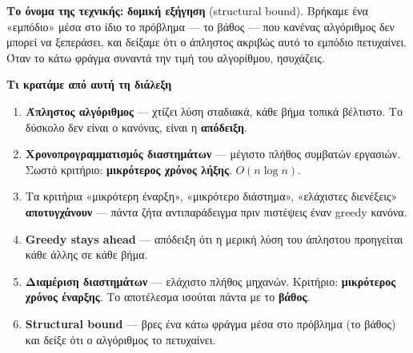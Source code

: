\documentclass[11pt,a4paper]{article}
\begin{document}
\begin{intuition}
\textbf{Το όνομα της τεχνικής:} \textbf{δομική εξήγηση} (structural bound).
Βρήκαμε ένα «εμπόδιο» μέσα στο ίδιο το πρόβλημα --- το βάθος --- που κανένας
αλγόριθμος δεν μπορεί να ξεπεράσει, και δείξαμε ότι ο άπληστος ακριβώς αυτό το
εμπόδιο πετυχαίνει. Όταν το κάτω φράγμα συναντά την τιμή του αλγορίθμου,
ησυχάζεις.
\end{intuition}

\begin{recapbox}
\textbf{Τι κρατάμε από αυτή τη διάλεξη}
\begin{enumerate}
  \item \textbf{Άπληστος αλγόριθμος} --- χτίζει λύση σταδιακά, κάθε βήμα τοπικά
  βέλτιστο. Το δύσκολο δεν είναι ο κανόνας, είναι η \textbf{απόδειξη}.
  \item \textbf{Χρονοπρογραμματισμός διαστημάτων} --- μέγιστο πλήθος συμβατών
  εργασιών. Σωστό κριτήριο: \textbf{μικρότερος χρόνος λήξης}. $O(n \log n)$.
  \item Τα κριτήρια «μικρότερη έναρξη», «μικρότερο διάστημα», «ελάχιστες
  διενέξεις» \textbf{αποτυγχάνουν} --- πάντα ζήτα αντιπαράδειγμα πριν πιστέψεις
  έναν greedy κανόνα.
  \item \textbf{Greedy stays ahead} --- απόδειξη ότι η μερική λύση του άπληστου
  προηγείται κάθε άλλης σε κάθε βήμα.
  \item \textbf{Διαμέριση διαστημάτων} --- ελάχιστο πλήθος μηχανών. Κριτήριο:
  \textbf{μικρότερος χρόνος έναρξης}. Το αποτέλεσμα ισούται πάντα με το
  \textbf{βάθος}.
  \item \textbf{Structural bound} --- βρες ένα κάτω φράγμα μέσα στο πρόβλημα (το
  βάθος) και δείξε ότι ο αλγόριθμος το πετυχαίνει.
\end{enumerate}
\end{recapbox}

\lecturefooter
\end{document}
